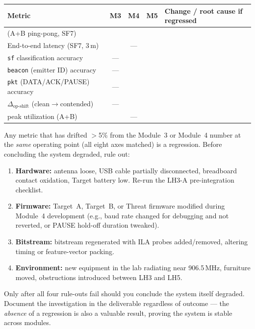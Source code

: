 \documentclass[11pt,letterpaper]{article}
\begin{document}
\begin{table}[h!]
	\centering
	\renewcommand{\arraystretch}{1.3}
	\begin{tabularx}{\textwidth}{l c c c X}
		\toprule
		\textbf{Metric} & \textbf{M3} & \textbf{M4} & \textbf{M5} & \textbf{Change / root cause if regressed} \\
		\midrule
		\PER{} (A+B ping-pong, SF7)                & & & & \\
		End-to-end latency (SF7, 3\,m)             & & --- & & \\
		\texttt{sf} classification accuracy        & --- & & & \\
		\texttt{beacon} (emitter ID) accuracy      & --- & & & \\
		\texttt{pkt} (DATA/ACK/PAUSE) accuracy     & --- & & & \\
		$\Delta_{\text{op-shift}}$ (clean$\to$contended) & --- & & & \\
		\FIFO{} peak utilization (A+B)             & & --- & & \\
		\bottomrule
	\end{tabularx}
\end{table}

Any metric that has drifted $>$5\% from the Module~3 or Module~4 number at the \emph{same} operating point (all eight axes matched) is a regression. Before concluding the system degraded, rule out:

\begin{tcolorbox}[warning={Regression Investigation Order}]
	\begin{enumerate}[leftmargin=1.2em]
		\item \textbf{Hardware:} antenna loose, USB cable partially disconnected, breadboard contact oxidation, Target battery low. Re-run the LH3-A pre-integration checklist.
		\item \textbf{Firmware:} Target~A, Target~B, or Threat firmware modified during Module~4 development (e.g., baud rate changed for debugging and not reverted, or PAUSE hold-off duration tweaked).
		\item \textbf{Bitstream:} \FPGA{} bitstream regenerated with \mbox{ILA{}} probes added/removed, altering timing or feature-vector packing.
		\item \textbf{Environment:} new equipment in the lab radiating near 906.5\,MHz, furniture moved, obstructions introduced between LH3 and LH5.
	\end{enumerate}
	Only after all four rule-outs fail should you conclude the system itself degraded. Document the investigation in the deliverable regardless of outcome --- the \emph{absence} of a regression is also a valuable result, proving the system is stable across modules.
\end{tcolorbox}
\end{document}
